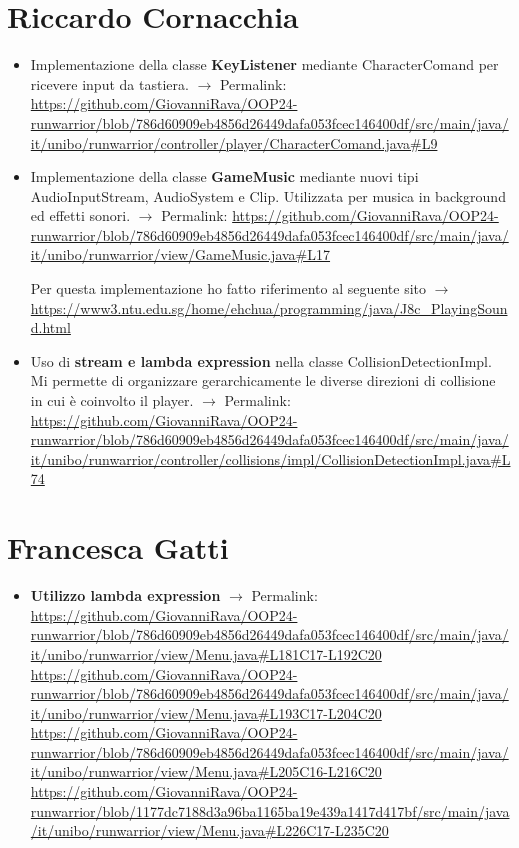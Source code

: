 \documentclass[a4paper,12pt]{report}
\begin{document}
\section{Riccardo Cornacchia}
\begin{itemize}
    \item Implementazione della classe \textbf{KeyListener} mediante CharacterComand per ricevere input da tastiera. $\rightarrow$ Permalink:
    \url{https://github.com/GiovanniRava/OOP24-runwarrior/blob/786d60909eb4856d26449dafa053fcec146400df/src/main/java/it/unibo/runwarrior/controller/player/CharacterComand.java#L9}
    \item Implementazione della classe \textbf{GameMusic} mediante nuovi tipi AudioInputStream, AudioSystem e Clip. 
    Utilizzata per musica in background ed effetti sonori. $\rightarrow$ Permalink:
    \url{https://github.com/GiovanniRava/OOP24-runwarrior/blob/786d60909eb4856d26449dafa053fcec146400df/src/main/java/it/unibo/runwarrior/view/GameMusic.java#L17}
    
    Per questa implementazione ho fatto riferimento al seguente sito $\rightarrow$
    \url{https://www3.ntu.edu.sg/home/ehchua/programming/java/J8c_PlayingSound.html}
    \item Uso di \textbf{stream e lambda expression} nella classe CollisionDetectionImpl. Mi permette di organizzare gerarchicamente 
    le diverse direzioni di collisione in cui è coinvolto il player. $\rightarrow$ Permalink:
    \url{https://github.com/GiovanniRava/OOP24-runwarrior/blob/786d60909eb4856d26449dafa053fcec146400df/src/main/java/it/unibo/runwarrior/controller/collisions/impl/CollisionDetectionImpl.java#L74}
\end{itemize}

\section{Francesca Gatti}
\begin{itemize}
    \item \textbf{Utilizzo lambda expression} $\rightarrow$ Permalink:
    \url{https://github.com/GiovanniRava/OOP24-runwarrior/blob/786d60909eb4856d26449dafa053fcec146400df/src/main/java/it/unibo/runwarrior/view/Menu.java#L181C17-L192C20}
    \url{https://github.com/GiovanniRava/OOP24-runwarrior/blob/786d60909eb4856d26449dafa053fcec146400df/src/main/java/it/unibo/runwarrior/view/Menu.java#L193C17-L204C20}
    \url{https://github.com/GiovanniRava/OOP24-runwarrior/blob/786d60909eb4856d26449dafa053fcec146400df/src/main/java/it/unibo/runwarrior/view/Menu.java#L205C16-L216C20}
    \url{https://github.com/GiovanniRava/OOP24-runwarrior/blob/1177dc7188d3a96ba1165ba19e439a1417d417bf/src/main/java/it/unibo/runwarrior/view/Menu.java#L226C17-L235C20}
\end{itemize}
\end{document}
